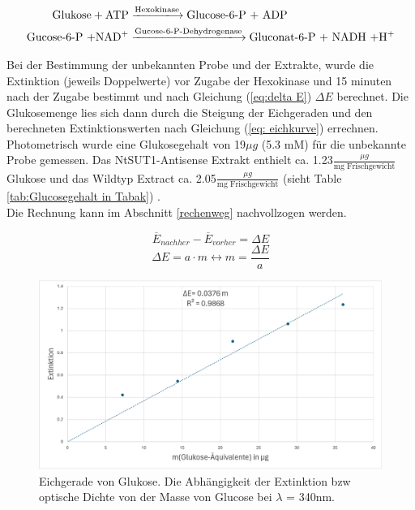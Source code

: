 \documentclass[10pt,a4paper]{article}
\begin{document}
		\begin{equation}\label{reaktionsgleichung}
			\begin{split}
				\text{Glukose} + \text{ATP} &\xlongrightarrow{\text{Hexokinase}} \text{Glucose-6-P + ADP}\\
				\text{Gucose-6-P +NAD$^+$} &\xlongrightarrow{\text{Gucose-6-P-Dehydrogenase}} \text{Gluconat-6-P + NADH +H$^+$}
			\end{split}
		\end{equation}
		
		Bei der Bestimmung der unbekannten Probe und der Extrakte, wurde die Extinktion (jeweils Doppelwerte) vor Zugabe der Hexokinase und 15 minuten nach der Zugabe bestimmt und nach Gleichung (\ref{eq:delta E}) $\Delta E$ berechnet. Die Glukosemenge lies sich dann durch die Steigung der Eichgeraden und den berechneten Extinktionswerten nach Gleichung (\ref{eq: eichkurve}) errechnen. Photometrisch wurde eine Glukosegehalt von 19$\mu g$ (5.3 mM) für die unbekannte Probe gemessen. Das NtSUT1-Antisense Extrakt enthielt ca. 1.23$\frac{\mu g}{\text{mg Frischgewicht}}$ Glukose und das Wildtyp Extract ca. 2.05$\frac{\mu g}{\text{mg Frischgewicht}}$ (sieht Table \ref{tab:Glucosegehalt in Tabak}) .\\
		Die Rechnung kann im Abschnitt \ref{rechenweg} nachvollzogen werden.
		
		\begin{equation}\label{eq:delta E}
			\overline{E}_{nachher} - \overline{E}_{vorher}=\Delta E
		\end{equation}
		\begin{equation}\label{eq: eichkurve}
			\Delta E = a \cdot m \leftrightarrow m=\frac{\Delta E}{a}
		\end{equation}
		\begin{figure}[H]
			\centering
			\includegraphics[width=0.75\linewidth]{Eichgerade.png}
			\caption{Eichgerade von Glukose. Die Abhängigkeit der Extinktion bzw optische Dichte von der Masse von Glucose bei  $\lambda$ = 340nm.}
			\label{Abbildung 1}
		\end{figure}
		
\end{document}
